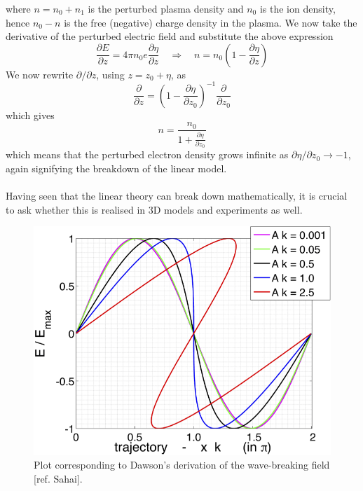 where $n=n_0+n_1$ is the perturbed plasma density and $n_0$ is the ion density, hence $n_0-n$ is the free (negative) charge density in the plasma. We now take the derivative of the perturbed electric field and substitute the above expression
\begin{equation}
\frac{\partial E}{\partial z}=4\pi n_0 e \frac{\partial \eta}{\partial z} \quad \Rightarrow \quad n=n_0\left(1-\frac{\partial \eta}{\partial z}\right)
\end{equation}
We now rewrite $\partial /\partial z$, using $z=z_0+\eta$, as
\begin{equation}
\frac{\partial}{\partial z}=\left(1-\frac{\partial \eta }{\partial z_0}\right)^{-1}\frac{\partial}{\partial z_0}
\end{equation}
which gives
\begin{equation}
n=\frac{n_0}{1+\frac{\partial \eta }{\partial z_0}}
 \end{equation} 
 which means that the perturbed electron density grows infinite as $\partial \eta/\partial z_0\to -1$, again signifying the breakdown of the linear model.\\
\\
Having seen that the linear theory can break down mathematically, it is crucial to ask whether this is realised in 3D models and experiments as well. 
\begin{figure}
\centering
\includegraphics[scale=1]{SahaiThesisPlot.png}
\caption{Plot corresponding to Dawson's derivation of the wave-breaking field [ref. Sahai].}
\label{DawsonCriterionPlot}
\end{figure}

